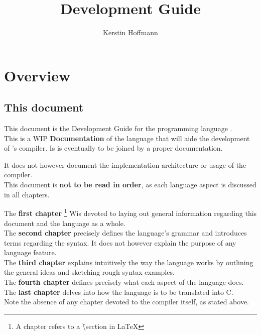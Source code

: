\documentclass{article}
\title{\lazydog  Development Guide}
\author{Kerstin Hoffmann}
\date{}
\begin{document}

\focus
\maketitle
\tableofcontents

\section{Overview}
\subsection{This document}
This document is the Development Guide
for the programming language \lazydog.\\

This is a WIP {\bf Documentation} of the language
that will aide the development of \lazydog's compiler.
Is is eventually to be joined by a proper
documentation.

It does not however document the implementation
architecture or usage of the \lazydog
compiler.\\

This document is {\bf not to be read in order},
as each language aspect is discussed in all chapters.

The {\bf first chapter}
\footnote{A chapter refers to a \v{\textbackslash section} in \LaTeX}
Wis devoted to laying
out general information regarding this document
and the language as a whole.\\

The {\bf second chapter} precisely defines
the language's grammar and introduces terms
regarding the syntax. 
It does not however explain the purpose of any language
feature.\\

The {\bf third chapter} explains intuitively the way the language
works by outlining the general ideas and sketching rough
syntax examples.\\

The {\bf fourth chapter} defines precisely what each
aspect of the language does.\\

The {\bf last chapter} delves into how the language is
to be translated into C.\\

Note the absence of any chapter devoted to the compiler itself,
as stated above.
\end{document}
